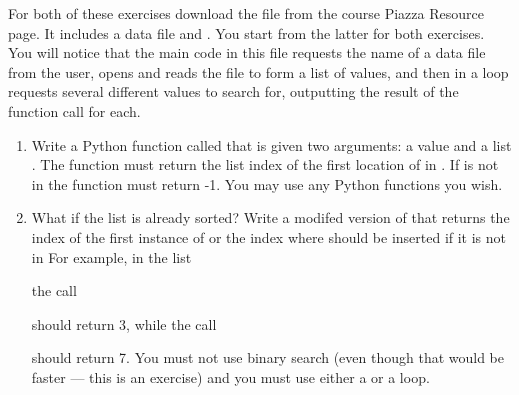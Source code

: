 \documentclass[letterpaper,10pt,english]{sphinxmanual}
\begin{document}
For both of these exercises download the file  from
the course Piazza Resource page.  It includes a data file and
.  You start from the latter for both exercises.
You will notice that the main code in this file requests the name of a
data file from the user, opens and reads the file to form a list of
values, and then in a loop requests several different values to search
for, outputting the result of the function call for each.
\begin{enumerate}
\item {} 
Write a Python function called  that is given two
arguments:  a value  and a list .  The function must
return the list index of the first location of  in .  If
 is not in  the function must return -1.  You may use any
Python  functions you wish.

\item {} 
What if the list is already sorted? Write a modifed version of
 that returns the index of the first instance of
 or the index where  should be inserted if it is not in
 For example, in the list

%
\begin{sphinxVerbatim}[commandchars=\\\{\}]
  \PYG{p}{[}        \PYG{p}{]}
\end{sphinxVerbatim}

the call

%
\begin{sphinxVerbatim}[commandchars=\\\{\}]
 
\end{sphinxVerbatim}

should return 3, while the call

%
\begin{sphinxVerbatim}[commandchars=\\\{\}]
  
\end{sphinxVerbatim}

should return 7.  You must not use binary search (even though that
would be faster — this is an exercise) and you must use either a
 or a  loop.

\end{enumerate}
\end{document}
